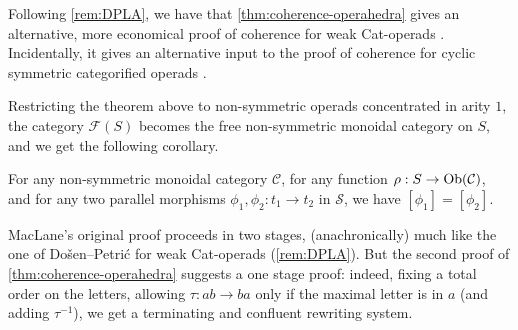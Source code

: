 Following \cref{rem:DPLA}, we have that \cref{thm:coherence-operahedra} gives an alternative, more economical proof of coherence for weak Cat-operads \cite[Prop.~14.2]{DP15}.
Incidentally, it gives an alternative input to the proof of coherence for cyclic symmetric categorified operads \cite{curienCategorifiedCyclicOperads2020}.

Restricting the theorem above to non-symmetric operads concentrated in arity $1$, the category $\mathcal{F}(S)$ becomes the free non-symmetric monoidal category on $S$, and we get the following corollary. 

\begin{corollary}
\label{cor:MacLane}
    For any non-symmetric monoidal category $\mathcal{C}$, for any function $\rho : S \to \mathrm{Ob}(\mathcal{C})$, and for any two parallel morphisms $\phi_1,\phi_2: t_1 \to t_2$ in $\mathcal{S}$, we have $[\phi_1]=[\phi_2]$.
\end{corollary}

\begin{rem}
\end{rem}

\begin{rem}
\label{rem:29}
MacLane's original proof \cite{MacLane63} proceeds in two stages, (anachronically) much like the one of Do{\v s}en--Petri{\'c} for weak Cat-operads (\cref{rem:DPLA}).
But the second proof of \cref{thm:coherence-operahedra} suggests a one stage proof: indeed, fixing a total order on the letters, allowing $\tau: ab \to ba$ only if the maximal letter is in $a$ (and adding $\tau^{-1}$), we get a terminating and confluent rewriting system. 
\end{rem}



